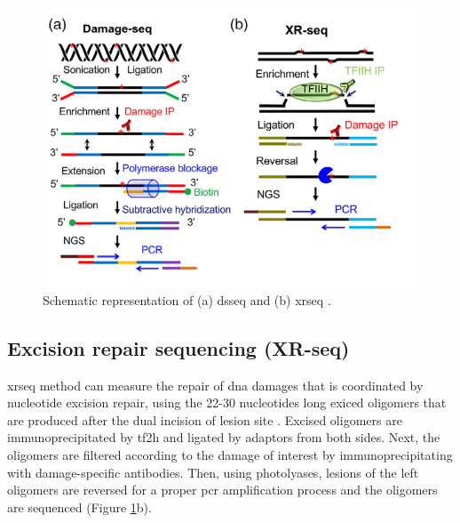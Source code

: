 \begin{figure}[H]
    \begin{center}
    \includegraphics[width=\textwidth]{Chapters/1_introduction/figures/dsxrseq}
    \caption{Schematic representation of (a) \gls{dsseq} and (b) \gls{xrseq} \citep{li2020methodologies}.}
    \label{fig:dsxrseq}
    \end{center}
    \end{figure}

\subsection{Excision repair sequencing (XR-seq)}

\gls{xrseq} method can measure the repair of \gls{dna} damages that is coordinated by nucleotide excision repair, using the 22-30 nucleotides long exiced oligomers that are produced after the dual incision of lesion site \citep{hu2019genome,hu2016cisplatin}. Excised oligomers are immunoprecipitated by \gls{tf2h} and ligated by adaptors from both sides. Next, the oligomers are filtered according to the damage of interest by immunoprecipitating with damage-specific antibodies. Then, using photolyases, lesions of the left oligomers are reversed for a proper \gls{pcr} amplification process and the oligomers are sequenced (Figure \ref{fig:dsxrseq}b).
